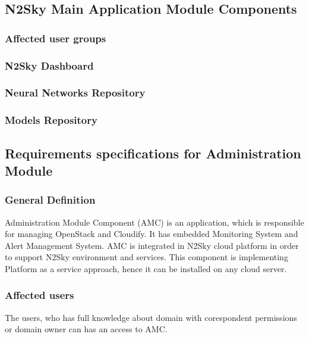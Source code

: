 \subsection{N2Sky Main Application Module Components}\label{N2Sky Components}
\subsubsection{Affected user groups}\label{Affected user groups 2}
\subsubsection{N2Sky Dashboard}\label{N2Sky Dashboard}
\subsubsection{Neural Networks Repository}\label{Neural Networks Repository}
\subsubsection{Models Repository}\label{Models Repository}

\subsection{Requirements specifications for Administration Module}\label{Administration components}

\subsubsection{General Definition}\label{General Definition AMC}

Administration Module Component (AMC) is an application, which is responsible for managing OpenStack and Cloudify. It has embedded Monitoring System and Alert Management System. AMC is integrated in N2Sky cloud platform in order to support N2Sky environment and services. This component is implementing Platform as a service approach, hence it can be installed on any cloud server. 

\subsubsection{Affected users}\label{Affected users}

The users, who has full knowledge about domain with corespondent permissions or domain owner can has an access to AMC.

